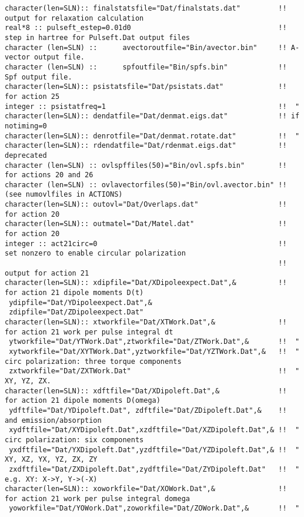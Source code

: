 \begin{verbatim}
character(len=SLN):: finalstatsfile="Dat/finalstats.dat"         !! output for relaxation calculation
real*8 :: pulseft_estep=0.01d0                                   !! step in hartree for Pulseft.Dat output files
character (len=SLN) ::      avectoroutfile="Bin/avector.bin"     !! A-vector output file.        
character (len=SLN) ::      spfoutfile="Bin/spfs.bin"            !! Spf output file.
character(len=SLN):: psistatsfile="Dat/psistats.dat"             !! for action 25
integer :: psistatfreq=1                                         !!  "
character(len=SLN):: dendatfile="Dat/denmat.eigs.dat"            !! if notiming=0
character(len=SLN):: denrotfile="Dat/denmat.rotate.dat"          !!  "
character(len=SLN):: rdendatfile="Dat/rdenmat.eigs.dat"          !! deprecated
character (len=SLN) :: ovlspffiles(50)="Bin/ovl.spfs.bin"        !! for actions 20 and 26 
character (len=SLN) :: ovlavectorfiles(50)="Bin/ovl.avector.bin" !!      (see numovlfiles in ACTIONS)
character(len=SLN):: outovl="Dat/Overlaps.dat"                   !! for action 20
character(len=SLN):: outmatel="Dat/Matel.dat"                    !! for action 20
integer :: act21circ=0                                           !! set nonzero to enable circular polarization 
                                                                 !!     output for action 21
character(len=SLN):: xdipfile="Dat/XDipoleexpect.Dat",&          !! for action 21 dipole moments D(t)
 ydipfile="Dat/YDipoleexpect.Dat",&
 zdipfile="Dat/ZDipoleexpect.Dat"                 
character(len=SLN):: xtworkfile="Dat/XTWork.Dat",&               !! for action 21 work per pulse integral dt
 ytworkfile="Dat/YTWork.Dat",ztworkfile="Dat/ZTWork.Dat",&       !!  "
 xytworkfile="Dat/XYTWork.Dat",yztworkfile="Dat/YZTWork.Dat",&   !!  "  circ polarization: three torque components
 zxtworkfile="Dat/ZXTWork.Dat"                                   !!  "  XY, YZ, ZX.
character(len=SLN):: xdftfile="Dat/XDipoleft.Dat",&              !! for action 21 dipole moments D(omega)
 ydftfile="Dat/YDipoleft.Dat", zdftfile="Dat/ZDipoleft.Dat",&    !! and emission/absorption
 xydftfile="Dat/XYDipoleft.Dat",xzdftfile="Dat/XZDipoleft.Dat",& !!  "  circ polarization: six components
 yxdftfile="Dat/YXDipoleft.Dat",yzdftfile="Dat/YZDipoleft.Dat",& !!  "  XY, XZ, YX, YZ, ZX, ZY
 zxdftfile="Dat/ZXDipoleft.Dat",zydftfile="Dat/ZYDipoleft.Dat"   !!  "  e.g. XY: X->Y, Y->(-X)
character(len=SLN):: xoworkfile="Dat/XOWork.Dat",&               !! for action 21 work per pulse integral domega
 yoworkfile="Dat/YOWork.Dat",zoworkfile="Dat/ZOWork.Dat",&       !!  "

\end{verbatim}
